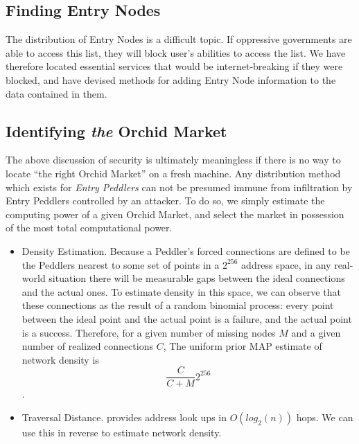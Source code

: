 

\subsection{Finding Entry Nodes}
\label{bootstrapping}

The distribution of Entry Nodes is a difficult topic. If oppressive governments are able to access this list, they will block user's abilities to access the list. We have therefore located essential services that would be internet-breaking if they were blocked, and have devised methods for adding Entry Node information to the data contained in them.

\subsection{Identifying \emph{the} Orchid Market}

The above discussion of security is ultimately meaningless if there is no way to locate ``the right Orchid Market'' on a fresh machine. Any distribution method which exists for \emph{Entry Peddlers} can not be presumed immune from infiltration by Entry Peddlers controlled by an attacker. To do so, we simply estimate the computing power of a given Orchid Market, and select the market in possession of the most total computational power.

\begin{itemize}
\item Density Estimation. Because a Peddler's forced connections are defined to be the Peddlers nearest to some set of points in a $2^{256}$ address space, in any real-world situation there will be measurable gaps between the ideal connections and the actual ones. To estimate density in this space, we can observe that these connections as the result of a random binomial process: every point between the ideal point and the actual point is a failure, and the actual point is a success. Therefore, for a given number of missing nodes $M$ and a given number of realized connections $C$, The uniform prior MAP estimate of network density is $$\frac{C}{C + M} 2^{256}$$.
\item Traversal Distance. \TOM{} provides address look ups in $O(log_2(n))$ hops. We can use this in reverse to estimate network density.
\end{itemize}

